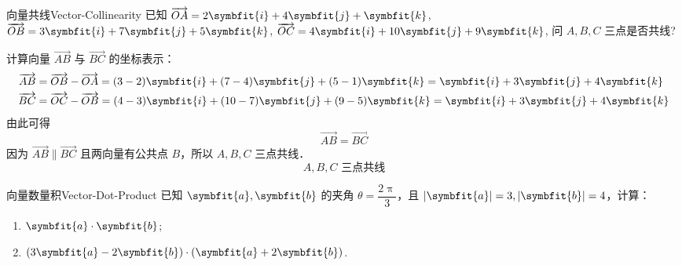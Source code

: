 \begin{problem}{向量共线}{Vector-Collinearity}
    已知 $\overrightarrow{OA} = 2\symbfit{i} + 4\symbfit{j} + \symbfit{k}$, $\overrightarrow{OB} = 3\symbfit{i} + 7\symbfit{j} + 5\symbfit{k}$, $\overrightarrow{OC} = 4\symbfit{i} + 10\symbfit{j} + 9\symbfit{k}$, 问 $A, B, C$ 三点是否共线?
\end{problem}

\begin{solution}
    计算向量 $\overrightarrow{AB}$ 与 $\overrightarrow{BC}$ 的坐标表示：
    \begin{equation}
        \begin{aligned}
            \overrightarrow{AB} & = \overrightarrow{OB} - \overrightarrow{OA} = (3-2)\symbfit{i} + (7-4)\symbfit{j} + (5-1)\symbfit{k} = \symbfit{i} + 3\symbfit{j} + 4\symbfit{k}  \\
            \overrightarrow{BC} & = \overrightarrow{OC} - \overrightarrow{OB} = (4-3)\symbfit{i} + (10-7)\symbfit{j} + (9-5)\symbfit{k} = \symbfit{i} + 3\symbfit{j} + 4\symbfit{k}
        \end{aligned}
    \end{equation}
    由此可得
    \begin{equation}
        \overrightarrow{AB} = \overrightarrow{BC}
    \end{equation}
    因为 $\overrightarrow{AB} \parallel \overrightarrow{BC}$ 且两向量有公共点 $B$，所以 $A, B, C$ 三点共线．
    \begin{equation}
        \boxed{A, B, C \text{ 三点共线}}
    \end{equation}
\end{solution}

\begin{problem}{向量数量积}{Vector-Dot-Product}
    已知 $\symbfit{a}, \symbfit{b}$ 的夹角 $\theta = \dfrac{2\uppi}{3}$，且 $|\symbfit{a}| = 3, |\symbfit{b}| = 4$，计算：
    \begin{enumerate}
        \item $\symbfit{a} \cdot \symbfit{b}$;
        \item $(3\symbfit{a} - 2\symbfit{b}) \cdot (\symbfit{a} + 2\symbfit{b})$.
    \end{enumerate}
\end{problem}

